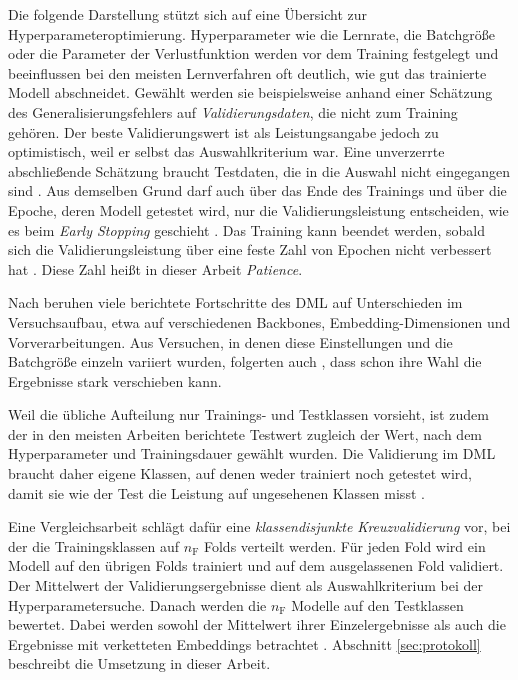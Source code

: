Die folgende Darstellung stützt sich auf eine Übersicht zur Hyperparameteroptimierung. Hyperparameter wie die Lernrate, die Batchgröße oder die Parameter der Verlustfunktion werden vor dem Training festgelegt und beeinflussen bei den meisten Lernverfahren oft deutlich, wie gut das trainierte Modell abschneidet. Gewählt werden sie beispielsweise anhand einer Schätzung des Generalisierungsfehlers auf \emph{Validierungsdaten}, die nicht zum Training gehören. Der beste Validierungswert ist als Leistungsangabe jedoch zu optimistisch, weil er selbst das Auswahlkriterium war. Eine unverzerrte abschließende Schätzung braucht Testdaten, die in die Auswahl nicht eingegangen sind \cite{bischl_hyperparameter_2023}. Aus demselben Grund darf auch über das Ende des Trainings und über die Epoche, deren Modell getestet wird, nur die Validierungsleistung entscheiden, wie es beim \emph{Early Stopping} geschieht \cite{musgrave_metric_2020}. Das Training kann beendet werden, sobald sich die Validierungsleistung über eine feste Zahl von Epochen nicht verbessert hat \cite{musgrave_metric_2020, berton_all_2025}. Diese Zahl heißt in dieser Arbeit \emph{Patience}.

Nach \textcite{musgrave_metric_2020} beruhen viele berichtete Fortschritte des \ac{DML} auf Unterschieden im Versuchsaufbau, etwa auf verschiedenen Backbones, Embedding-Dimensionen und Vorverarbeitungen. Aus Versuchen, in denen diese Einstellungen und die Batchgröße einzeln variiert wurden, folgerten auch \textcite{roth_revisiting_2020}, dass schon ihre Wahl die Ergebnisse stark verschieben kann. 

Weil die übliche Aufteilung nur Trainings- und Testklassen vorsieht, ist zudem der in den meisten Arbeiten berichtete Testwert zugleich der Wert, nach dem Hyperparameter und Trainingsdauer gewählt wurden. Die Validierung im \ac{DML} braucht daher eigene Klassen, auf denen weder trainiert noch getestet wird, damit sie wie der Test die Leistung auf ungesehenen Klassen misst \cite{musgrave_metric_2020}.

Eine Vergleichsarbeit schlägt dafür eine \emph{klassendisjunkte Kreuzvalidierung} vor, bei der die Trainingsklassen auf $n_{\mathrm{F}}$ Folds verteilt werden. Für jeden Fold wird ein Modell auf den übrigen Folds trainiert und auf dem ausgelassenen Fold validiert. Der Mittelwert der Validierungsergebnisse dient als Auswahlkriterium bei der Hyperparametersuche. Danach werden die $n_{\mathrm{F}}$ Modelle auf den Testklassen bewertet. Dabei werden sowohl der Mittelwert ihrer Einzelergebnisse als auch die Ergebnisse mit verketteten Embeddings betrachtet \cite{musgrave_metric_2020}. Abschnitt \ref{sec:protokoll} beschreibt die Umsetzung in dieser Arbeit.

